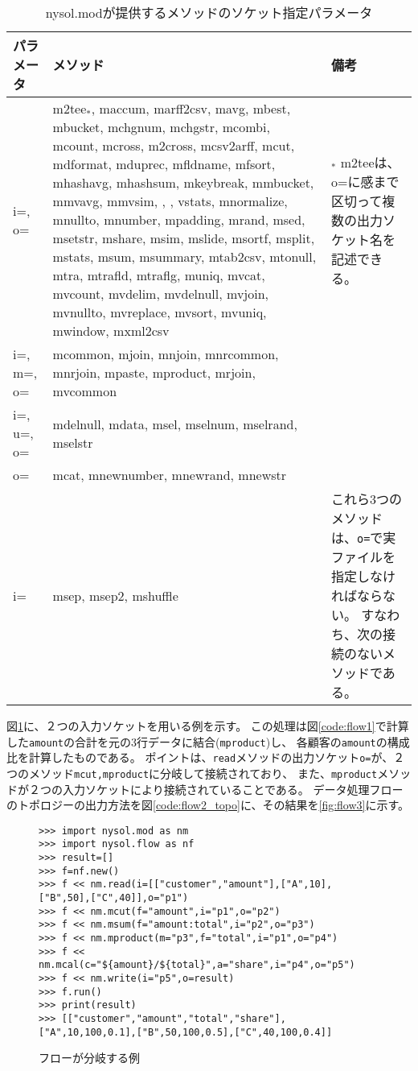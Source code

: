 \begin{table}[hbt]
\begin{center}
 \caption{nysol.modが提供するメソッドのソケット指定パラメータ\label{tbl:nysol.mod_socket}}
{\footnotesize
	\begin{tabular}{l|p{10cm}|p{5cm}}
\hline
パラメータ & メソッド & 備考 \\
\hline
i=, o=    & m2tee$_*$, maccum, marff2csv, mavg, mbest, mbucket, mchgnum, mchgstr, mcombi, mcount, mcross, m2cross, mcsv2arff, mcut, mdformat, mduprec, mfldname, mfsort, mhashavg, mhashsum, mkeybreak, mmbucket, mmvavg, mmvsim, , , vstats, mnormalize, mnullto, mnumber, mpadding, mrand, msed, msetstr, mshare, msim, mslide, msortf, msplit, mstats, msum, msummary, mtab2csv, mtonull, mtra, mtrafld, mtraflg, muniq, mvcat, mvcount, mvdelim, mvdelnull, mvjoin, mvnullto, mvreplace, mvsort, mvuniq, mwindow, mxml2csv &
$_*$ m2teeは、o=に感まで区切って複数の出力ソケット名を記述できる。\\
i=, m=, o= & mcommon, mjoin, mnjoin, mnrcommon, mnrjoin, mpaste, mproduct, mrjoin, mvcommon &  \\
i=, u=, o= & mdelnull, mdata, msel, mselnum, mselrand, mselstr \\
o=       & mcat, mnewnumber, mnewrand, mnewstr \\
i=       & msep, msep2, mshuffle &
これら3つのメソッドは、\verb|o=|で実ファイルを指定しなければならない。
すなわち、次の接続のないメソッドである。\\
\hline
 \end{tabular}
}
\end{center}
\end{table}

図\ref{code:flow2}に、２つの入力ソケットを用いる例を示す。
この処理は図\ref{code:flow1}で計算した\verb|amount|の合計を元の3行データに結合(\verb|mproduct|)し、
各顧客の\verb|amount|の構成比を計算したものである。
ポイントは、\verb|read|メソッドの出力ソケット\verb|o=|が、２つのメソッド\verb|mcut,mproduct|に分岐して接続されており、
また、\verb|mproduct|メソッドが２つの入力ソケットにより接続されていることである。
データ処理フローのトポロジーの出力方法を図\ref{code:flow2_topo}に、その結果を\ref{fig:flow3}に示す。

\begin{figure}[htbp]
\begin{Verbatim}[baselinestretch=0.7,frame=single]
>>> import nysol.mod as nm
>>> import nysol.flow as nf
>>> result=[]
>>> f=nf.new()
>>> f << nm.read(i=[["customer","amount"],["A",10],["B",50],["C",40]],o="p1")
>>> f << nm.mcut(f="amount",i="p1",o="p2")
>>> f << nm.msum(f="amount:total",i="p2",o="p3")
>>> f << nm.mproduct(m="p3",f="total",i="p1",o="p4")
>>> f << nm.mcal(c="${amount}/${total}",a="share",i="p4",o="p5")
>>> f << nm.write(i="p5",o=result)
>>> f.run()
>>> print(result)
>>> [["customer","amount","total","share"],["A",10,100,0.1],["B",50,100,0.5],["C",40,100,0.4]]
\end{Verbatim}
\caption{フローが分岐する例\label{code:flow2}}
\end{figure}

